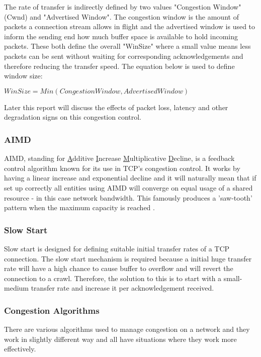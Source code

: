 The rate of transfer is indirectly defined by two values "Congestion Window" (Cwnd) and "Advertised Window". The congestion window is the amount of packets a connection stream allows in flight and the advertised window is used to inform the sending end how much buffer space is available to hold incoming packets. These both define the overall "WinSize" where a small value means less packets can be sent without waiting for corresponding acknowledgements and therefore reducing the transfer speed. The equation below is used to define window size: 

\begin{center}
	$WinSize = Min(CongestionWindow, AdvertisedWindow)$
\end{center}

Later this report will discuss the effects of packet loss, latency and other degradation signs on this congestion control.

 
\subsubsection*{AIMD}
AIMD, standing for \underline{A}dditive \underline{I}ncrease \underline{M}ultiplicative \underline{D}ecline, is a feedback control algorithm known for its use in TCP's congestion control. It works by having a linear increase and exponential decline and it will naturally mean that if set up correctly all entities using AIMD will converge on equal usage of a shared resource - in this case network bandwidth. This famously produces a 'saw-tooth' pattern when the maximum capacity is reached \citep{huston2006gigabit}.

\subsubsection*{Slow Start}
\label{ref:slowstart}
Slow start is designed for defining suitable initial transfer rates of a TCP connection. The slow start mechanism is required because a initial huge transfer rate will have a high chance to cause buffer to overflow and will revert the connection to a crawl. Therefore, the solution to this is to start with a small-medium transfer rate and increase it per acknowledgement received.

\subsubsection*{Congestion Algorithms}
There are various algorithms used to manage congestion on a network and they work in slightly different way and all have situations where they work more effectively.


